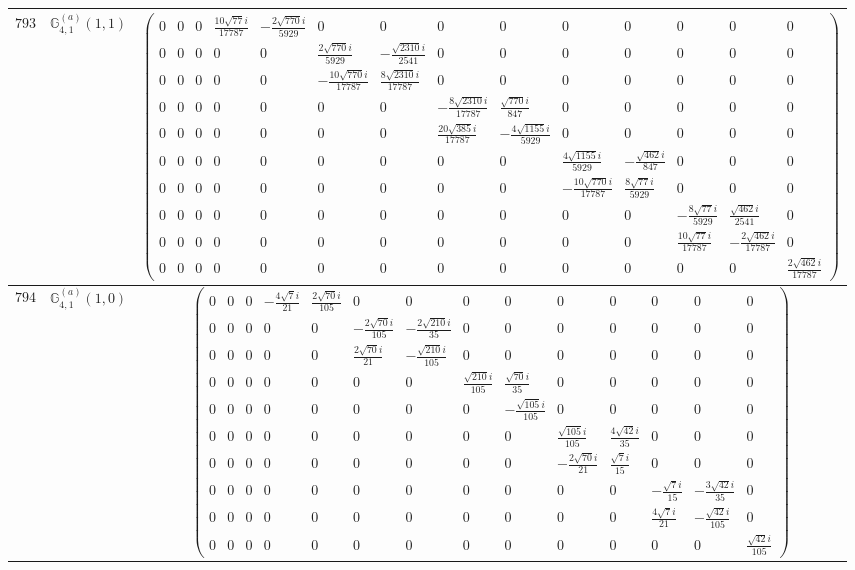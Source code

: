 \documentclass[fleqn,8pt,landscape]{jsarticle}
\begin{document}
\begin{center}
\begin{longtable}{ccc}
$ 793 $ & $ \mathbb{G}_{4,1}^{(a)}(1,1) $ & $ \begin{pmatrix} 0 & 0 & 0 & \frac{10 \sqrt{77} i}{17787} & - \frac{2 \sqrt{770} i}{5929} & 0 & 0 & 0 & 0 & 0 & 0 & 0 & 0 & 0 \\ 0 & 0 & 0 & 0 & 0 & \frac{2 \sqrt{770} i}{5929} & - \frac{\sqrt{2310} i}{2541} & 0 & 0 & 0 & 0 & 0 & 0 & 0 \\ 0 & 0 & 0 & 0 & 0 & - \frac{10 \sqrt{770} i}{17787} & \frac{8 \sqrt{2310} i}{17787} & 0 & 0 & 0 & 0 & 0 & 0 & 0 \\ 0 & 0 & 0 & 0 & 0 & 0 & 0 & - \frac{8 \sqrt{2310} i}{17787} & \frac{\sqrt{770} i}{847} & 0 & 0 & 0 & 0 & 0 \\ 0 & 0 & 0 & 0 & 0 & 0 & 0 & \frac{20 \sqrt{385} i}{17787} & - \frac{4 \sqrt{1155} i}{5929} & 0 & 0 & 0 & 0 & 0 \\ 0 & 0 & 0 & 0 & 0 & 0 & 0 & 0 & 0 & \frac{4 \sqrt{1155} i}{5929} & - \frac{\sqrt{462} i}{847} & 0 & 0 & 0 \\ 0 & 0 & 0 & 0 & 0 & 0 & 0 & 0 & 0 & - \frac{10 \sqrt{770} i}{17787} & \frac{8 \sqrt{77} i}{5929} & 0 & 0 & 0 \\ 0 & 0 & 0 & 0 & 0 & 0 & 0 & 0 & 0 & 0 & 0 & - \frac{8 \sqrt{77} i}{5929} & \frac{\sqrt{462} i}{2541} & 0 \\ 0 & 0 & 0 & 0 & 0 & 0 & 0 & 0 & 0 & 0 & 0 & \frac{10 \sqrt{77} i}{17787} & - \frac{2 \sqrt{462} i}{17787} & 0 \\ 0 & 0 & 0 & 0 & 0 & 0 & 0 & 0 & 0 & 0 & 0 & 0 & 0 & \frac{2 \sqrt{462} i}{17787} \end{pmatrix} $ \\ \hline
$ 794 $ & $ \mathbb{G}_{4,1}^{(a)}(1,0) $ & $ \begin{pmatrix} 0 & 0 & 0 & - \frac{4 \sqrt{7} i}{21} & \frac{2 \sqrt{70} i}{105} & 0 & 0 & 0 & 0 & 0 & 0 & 0 & 0 & 0 \\ 0 & 0 & 0 & 0 & 0 & - \frac{2 \sqrt{70} i}{105} & - \frac{2 \sqrt{210} i}{35} & 0 & 0 & 0 & 0 & 0 & 0 & 0 \\ 0 & 0 & 0 & 0 & 0 & \frac{2 \sqrt{70} i}{21} & - \frac{\sqrt{210} i}{105} & 0 & 0 & 0 & 0 & 0 & 0 & 0 \\ 0 & 0 & 0 & 0 & 0 & 0 & 0 & \frac{\sqrt{210} i}{105} & \frac{\sqrt{70} i}{35} & 0 & 0 & 0 & 0 & 0 \\ 0 & 0 & 0 & 0 & 0 & 0 & 0 & 0 & - \frac{\sqrt{105} i}{105} & 0 & 0 & 0 & 0 & 0 \\ 0 & 0 & 0 & 0 & 0 & 0 & 0 & 0 & 0 & \frac{\sqrt{105} i}{105} & \frac{4 \sqrt{42} i}{35} & 0 & 0 & 0 \\ 0 & 0 & 0 & 0 & 0 & 0 & 0 & 0 & 0 & - \frac{2 \sqrt{70} i}{21} & \frac{\sqrt{7} i}{15} & 0 & 0 & 0 \\ 0 & 0 & 0 & 0 & 0 & 0 & 0 & 0 & 0 & 0 & 0 & - \frac{\sqrt{7} i}{15} & - \frac{3 \sqrt{42} i}{35} & 0 \\ 0 & 0 & 0 & 0 & 0 & 0 & 0 & 0 & 0 & 0 & 0 & \frac{4 \sqrt{7} i}{21} & - \frac{\sqrt{42} i}{105} & 0 \\ 0 & 0 & 0 & 0 & 0 & 0 & 0 & 0 & 0 & 0 & 0 & 0 & 0 & \frac{\sqrt{42} i}{105} \end{pmatrix} $ \\ \hline

\end{longtable}
\end{center}
\end{document}
